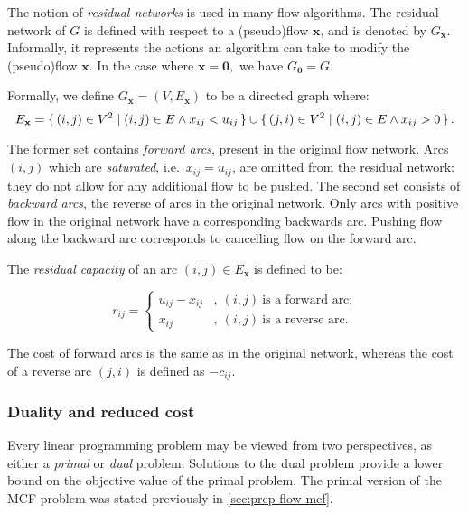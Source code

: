 
The notion of \emph{residual networks} is used in many flow algorithms. The residual network of $G$ is defined with respect to a (pseudo)flow $\mathbf{x}$, and is denoted by $G_{\mathbf{x}}$. Informally, it represents the actions an algorithm can take to modify the (pseudo)flow $\mathbf{x}$. In the case where $\mathbf{x=0},$ we have $G_{\mathbf{0}}=G$.

Formally, we define $G_{\mathbf{x}}=\left(V,E_{\mathbf{x}}\right)$ to be a directed graph where:
\begin{equation}
E_{\mathbf{x}}=\set{(i,j)\in V^{2} | (i,j)\in E\land x_{ij}<u_{ij}} \cup \set{(j,i)\in V^{2} | (i,j)\in E\land x_{ij}>0}. 
\end{equation}

The former set contains \emph{forward arcs}, present in the original flow network. Arcs $(i,j)$ which are \emph{saturated}, i.e.\ $x_{ij}=u_{ij}$, are omitted from the residual network: they do not allow for any additional flow to be pushed. The second set consists of \emph{backward arcs}, the reverse of arcs in the original network. Only arcs with positive flow in the original network have a corresponding backwards arc. Pushing flow along the backward arc corresponds to cancelling flow on the forward arc.

The \emph{residual capacity} of an arc $(i,j)\in E_{\mathbf{x}}$ is defined to be:

\begin{equation}
r_{ij}=\begin{cases}
u_{ij}-x_{ij} & ,\:(i,j)\:\mbox{is a forward arc;}\\
x_{ij} & ,\:(i,j)\:\mbox{is a reverse arc.}
\end{cases}
\end{equation}

The cost of forward arcs is the same as in the original network, whereas the cost of a reverse arc $(j,i)$ is defined as $-c_{ij}$.

\subsubsection{Duality and reduced cost} \label{sec:prep-flow-rc-and-dual}


Every linear programming problem may be viewed from two perspectives, as either a \emph{primal} or \emph{dual} problem. Solutions to the dual problem provide a lower bound on the objective value of the primal problem. The primal version of the MCF problem was stated previously in \cref{sec:prep-flow-mcf}. 

